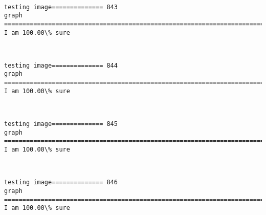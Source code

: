 \documentclass[11pt]{article}
\begin{document}
    \begin{center}
    \end{center}
    { \hspace*{\fill} \\}
    
    \begin{Verbatim}[commandchars=\\\{\}]
testing image============== 843
graph
============================================================================
I am 100.00\% sure

    \end{Verbatim}

    \begin{center}
    \end{center}
    { \hspace*{\fill} \\}
    
    \begin{Verbatim}[commandchars=\\\{\}]
testing image============== 844
graph
============================================================================
I am 100.00\% sure

    \end{Verbatim}

    \begin{center}
    \end{center}
    { \hspace*{\fill} \\}
    
    \begin{Verbatim}[commandchars=\\\{\}]
testing image============== 845
graph
============================================================================
I am 100.00\% sure

    \end{Verbatim}

    \begin{center}
    \end{center}
    { \hspace*{\fill} \\}
    
    \begin{Verbatim}[commandchars=\\\{\}]
testing image============== 846
graph
============================================================================
I am 100.00\% sure

    \end{Verbatim}
\end{document}
